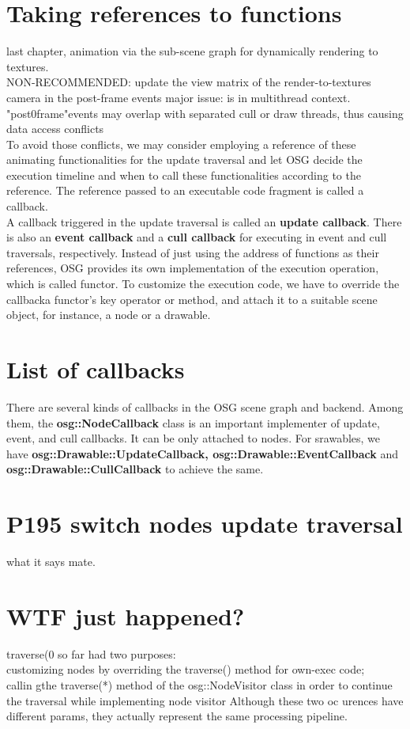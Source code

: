 \documentclass[a4paper,12pt]{book}
\begin{document}
\section{Taking references to functions}
last chapter, animation via the sub-scene graph for dynamically rendering to textures.\\
\textrightarrow NON-RECOMMENDED: update the view matrix of the render-to-textures camera in the post-frame events \textrightarrow major issue: is in multithread context.\\
"post0frame"events may overlap with separated cull or draw threads, thus causing data access conflicts\\
To avoid those conflicts, we may consider employing a reference of these animating functionalities for the update traversal and let OSG decide the execution timeline and when to call these functionalities according to the reference. The reference passed to an executable code fragment is called a callback.\\

A callback triggered in the update traversal is called an \textbf{update callback}. There is also an \textbf{event callback} and a \textbf{cull callback} for executing in event and cull traversals, respectively. Instead of just using the address of functions as their references, OSG provides its own implementation of the execution operation, which is called functor. To customize the execution code, we have to override the callbacka functor's key operator or method, and attach it to a suitable scene object, for instance, a node or a drawable.

\section{List of callbacks}
There are several kinds of callbacks in the OSG scene graph and backend. Among them, the \textbf{osg::NodeCallback} class is an important implementer of update, event, and cull callbacks. It can be only attached to nodes. For srawables, we have \textbf{osg::Drawable::UpdateCallback, osg::Drawable::EventCallback} and \textbf{osg::Drawable::CullCallback} to achieve the same.

\section{P195 switch nodes update traversal}
what it says mate.

\section{WTF just happened?}
traverse(0 so far had two purposes:\\
\textrightarrow customizing nodes by overriding the traverse() method for own-exec code;\\
\textrightarrow callin gthe traverse(*) method of the osg::NodeVisitor class in order to continue the traversal while implementing node visitor
Although these two oc urences have different params, they actually represent the same processing pipeline.
\end{document}
